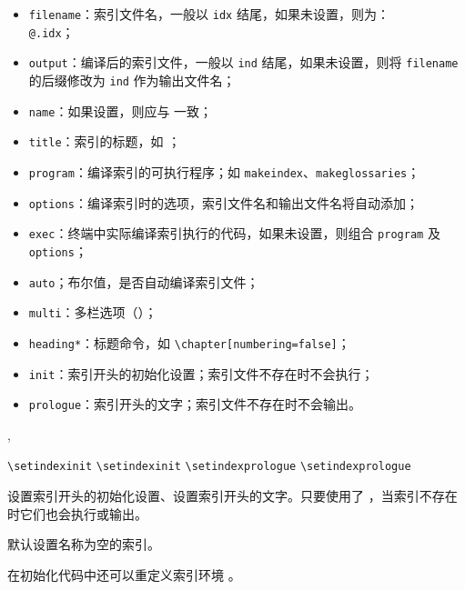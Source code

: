 \documentclass{cusdoc}
\begin{document}
\begin{itemize}[nosep]
  \item \texttt{filename}：索引文件名，一般以 \texttt{idx} 结尾，如果未设置，则为：
  \\\texttt{@}\texttt{.idx}；
  \item \texttt{output}：编译后的索引文件，一般以 \texttt{ind} 结尾，如果未设置，则将
  \texttt{filename} 的后缀修改为 \texttt{ind} 作为输出文件名；
  \item \texttt{name}：如果设置，则应与  一致；
  \item \texttt{title}：索引的标题，如 ；
  \item \texttt{program}：编译索引的可执行程序；如 \texttt{makeindex}、\texttt{makeglossaries}；
  \item \texttt{options}：编译索引时的选项，索引文件名和输出文件名将自动添加；
  \item \texttt{exec}：终端中实际编译索引执行的代码，如果未设置，则组合 \texttt{program} 及 \texttt{options}；
  \item \texttt{auto}；布尔值，是否自动编译索引文件；
  \item \texttt{multi}：多栏选项（）；
  \item \texttt{heading*}：标题命令，如 \verb|\chapter[numbering=false]|；
  \item \texttt{init}：索引开头的初始化设置；索引文件不存在时不会执行；
  \item \texttt{prologue}：索引开头的文字；索引文件不存在时不会输出。
\end{itemize}

\smallskip 
\begin{xample}
\stopxamplecode
\xamplecode
\medskip 
\end{xample}

\begin{function}{\setindexinit,\setindexprologue}
  \begin{syntax}
    \verb|\setindexinit| 
    \verb|\setindexinit|  
    \verb|\setindexprologue| 
    \verb|\setindexprologue|  
  \end{syntax}
设置索引开头的初始化设置、设置索引开头的文字。只要使用了 ，当索引不存在时它们也会执行或输出。

默认设置名称为空的索引。

在初始化代码中还可以重定义索引环境 。
\end{function}
\end{document}
